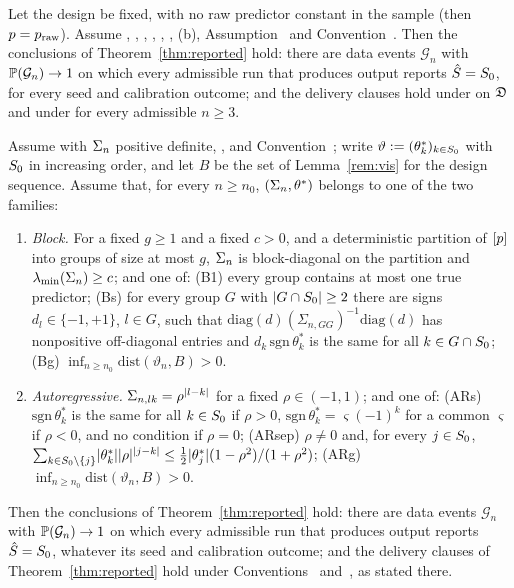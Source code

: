 
\begin{suppthm}\label{thm:reported-fixed}
Let the design be fixed, with no raw predictor constant in the sample (then $p=\praw$). Assume , , ,
, , , (b), Assumption~ and Convention~. Then the conclusions of
Theorem~\ref{thm:reported} hold: there are data events $\mathcal G_n$ with $\P(\mathcal G_n)\to1$ on which every
admissible run that produces output reports $\Shat=\Sz$, for every seed and calibration outcome; and the delivery
clauses hold under  on $\Dom$ and under  for every admissible $n\ge3$.
\end{suppthm}


\begin{suppcor}\label{cor:famc}
Assume  with $\Sig$ positive definite, ,  and Convention~; write
$\vartheta:=(\theta^*_k)_{k\in\Sz}$ with $\Sz$ in increasing order, and let $B$ be the set of Lemma~\ref{rem:vis} for the
design sequence. Assume that, for every $n\ge n_0$, $(\Sig,\tstar)$ belongs to one of the two families:
\begin{enumerate}[label=(\Alph*),leftmargin=2em,itemsep=1pt]
  \item \emph{Block.} For a fixed $g\ge1$ and a fixed $c>0$, and a deterministic partition of $\set p$ into groups of size at
    most $g$, $\Sig$ is block-diagonal on the partition and $\lmin(\Sig)\ge c$; and one of: (B1) every group contains at
    most one true predictor; (Bs) for every group $G$ with $\abs{G\cap\Sz}\ge2$ there are signs $d_l\in\{-1,+1\}$, $l\in G$,
    such that $\mathrm{diag}(d)(\Sigma_{n,GG})^{-1}\mathrm{diag}(d)$ has nonpositive off-diagonal entries and
    $d_k\,\mathrm{sgn}\,\theta^*_k$ is the same for all $k\in G\cap\Sz$; (Bg) $\inf_{n\ge n_0}\mathrm{dist}(\vartheta_n,B)>0$.
  \item \emph{Autoregressive.} $\Sigma_{n,lk}=\rho^{\abs{l-k}}$ for a fixed $\rho\in(-1,1)$; and one of: (ARs)
    $\mathrm{sgn}\,\theta^*_k$ is the same for all $k\in\Sz$ if $\rho>0$, $\mathrm{sgn}\,\theta^*_k=\varsigma(-1)^k$ for a
    common $\varsigma$ if $\rho<0$, and no condition if $\rho=0$; (ARsep) $\rho\neq0$ and, for every $j\in\Sz$,
    $\sum_{k\in\Sz\setminus\{j\}}\abs{\theta^*_k}\abs\rho^{\abs{j-k}}\le\tfrac12\abs{\theta^*_j}(1-\rho^2)/(1+\rho^2)$; (ARg)
    $\inf_{n\ge n_0}\mathrm{dist}(\vartheta_n,B)>0$.
\end{enumerate}
Then the conclusions of Theorem~\ref{thm:reported} hold: there are data events $\mathcal G_n$ with $\P(\mathcal G_n)\to1$
on which every admissible run that produces output reports $\Shat=\Sz$, whatever its seed and calibration outcome; and
the delivery clauses of Theorem~\ref{thm:reported} hold under Conventions~ and~, as stated there.
\end{suppcor}


